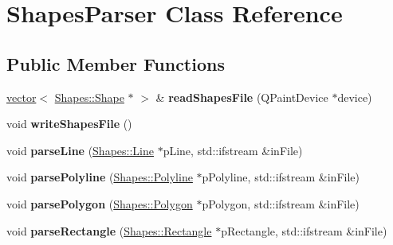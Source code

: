 \hypertarget{class_shapes_parser}{}\section{Shapes\+Parser Class Reference}
\label{class_shapes_parser}
\subsection*{Public Member Functions}
\begin{DoxyCompactItemize}
\item 
\mbox{\label{class_shapes_parser_a38e09afabacf59de58aaa83722b1524b}} 
\mbox{\hyperlink{classproject_1_1vector}{vector}}$<$ \mbox{\hyperlink{class_shapes_1_1_shape}{Shapes\+::\+Shape}} $\ast$ $>$ \& {\bfseries read\+Shapes\+File} (Q\+Paint\+Device $\ast$device)
\item 
\mbox{\label{class_shapes_parser_a2592fe033d8c7d68aa53cb0300410eab}} 
void {\bfseries write\+Shapes\+File} ()
\item 
\mbox{\label{class_shapes_parser_a270d7013a6d3705ecea43edf6869addc}} 
void {\bfseries parse\+Line} (\mbox{\hyperlink{class_shapes_1_1_line}{Shapes\+::\+Line}} $\ast$p\+Line, std\+::ifstream \&in\+File)
\item 
\mbox{\label{class_shapes_parser_ac265a6eacb930cfae5278ea85a571127}} 
void {\bfseries parse\+Polyline} (\mbox{\hyperlink{class_shapes_1_1_polyline}{Shapes\+::\+Polyline}} $\ast$p\+Polyline, std\+::ifstream \&in\+File)
\item 
\mbox{\label{class_shapes_parser_a3fb742510e8f672afabe5a22126fcaa8}} 
void {\bfseries parse\+Polygon} (\mbox{\hyperlink{class_shapes_1_1_polygon}{Shapes\+::\+Polygon}} $\ast$p\+Polygon, std\+::ifstream \&in\+File)
\item 
\mbox{\label{class_shapes_parser_a9de13df04fc0079a1c0e9957bc4c9039}} 
void {\bfseries parse\+Rectangle} (\mbox{\hyperlink{class_shapes_1_1_rectangle}{Shapes\+::\+Rectangle}} $\ast$p\+Rectangle, std\+::ifstream \&in\+File)
\item 
\mbox{\label{class_shapes_parser_a078e0fa75724c7e593c5f2e9d048c020}} 

\end{DoxyCompactItemize}
